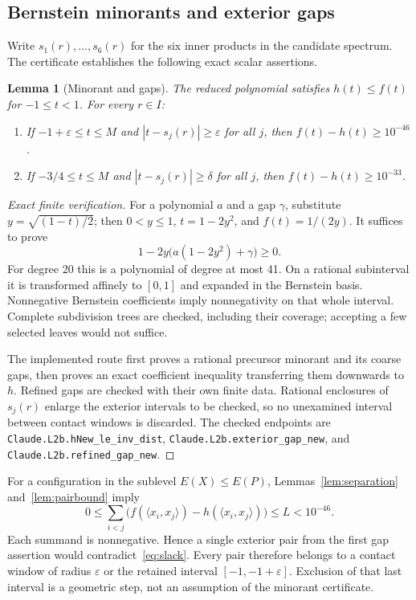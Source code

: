\documentclass[11pt]{article}
\newtheorem{lemma}[theorem]{Lemma}
\theoremstyle{remark}
\newcommand{\ip}[2]{\langle #1,#2\rangle}
\newcommand{\code}[1]{{\small\nolinkurl{#1}}}
\begin{document}
\subsection{Bernstein minorants and exterior gaps}
Write $s_1(r),\ldots,s_6(r)$ for the six inner products in the candidate
spectrum. The certificate establishes the following exact scalar assertions.
\begin{lemma}[Minorant and gaps]\label{lem:gaps}
The reduced polynomial satisfies $h(t)\le f(t)$ for $-1\le t<1$.
For every $r\in I$:
\begin{enumerate}
\item If $-1+\varepsilon\le t\le M$ and
      $|t-s_j(r)|\ge\varepsilon$ for all $j$, then
      $f(t)-h(t)\ge10^{-46}$.
\item If $-3/4\le t\le M$ and
      $|t-s_j(r)|\ge\delta$ for all $j$, then
      $f(t)-h(t)\ge10^{-33}$.
\end{enumerate}
\end{lemma}
\begin{proof}[Exact finite verification]
For a polynomial $a$ and a gap $\gamma$, substitute
$y=\sqrt{(1-t)/2}$; then $0<y\le1$, $t=1-2y^2$, and $f(t)=1/(2y)$.
It suffices to prove
\[
 1-2y\bigl(a(1-2y^2)+\gamma\bigr)\ge0.
\]
For degree 20 this is a polynomial of degree at most 41. On a rational
subinterval it is transformed affinely to $[0,1]$ and expanded in the
Bernstein basis. Nonnegative Bernstein coefficients imply nonnegativity on
that whole interval. Complete subdivision trees are checked, including their
coverage; accepting a few selected leaves would not suffice.

The implemented route first proves a rational precursor minorant and its
coarse gaps, then proves an exact coefficient inequality transferring them
downwards to $h$. Refined gaps are checked with their own finite data.
Rational enclosures of $s_j(r)$ enlarge the exterior intervals to be checked,
so no unexamined interval between contact windows is discarded.
The checked endpoints are \code{Claude.L2b.hNew_le_inv_dist},
\code{Claude.L2b.exterior_gap_new}, and
\code{Claude.L2b.refined_gap_new}.
\end{proof}

For a configuration in the sublevel $E(X)\le E(P)$, Lemmas~\ref{lem:separation}
and~\ref{lem:pairbound} imply
\begin{equation}\label{eq:slack}
 0\le\sum_{i<j}\bigl(f(\ip{x_i}{x_j})-h(\ip{x_i}{x_j})\bigr)\le L<10^{-46}.
\end{equation}
Each summand is nonnegative. Hence a single exterior pair from the first gap
assertion would contradict~\eqref{eq:slack}. Every pair therefore belongs to a
contact window of radius $\varepsilon$ or the retained interval
$[-1,-1+\varepsilon]$. Exclusion of that last interval is a geometric step,
not an assumption of the minorant certificate.
\end{document}
